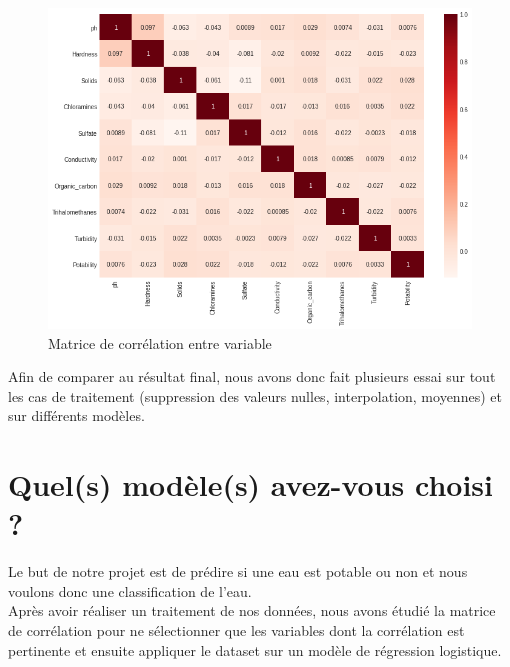 \documentclass[12pt, a4paper]{article}
\begin{document}
    \begin{figure}[H]
           \centering
           \includegraphics[width=\textwidth]{images/output_64_0.png}
           \caption{Matrice de corrélation entre variable}
            \label{fig:mat_corr}
    \end{figure}
    
    Afin de comparer au résultat final, nous avons donc fait plusieurs essai sur tout les cas de traitement (suppression des valeurs nulles, interpolation, moyennes) et sur différents modèles.
    \section{Quel(s) modèle(s) avez-vous choisi ?}
    Le but de notre projet est de prédire si une eau est potable ou non et nous voulons donc une classification de l'eau.\\
    Après avoir réaliser un traitement de nos données, nous avons étudié la matrice de corrélation pour ne sélectionner que les variables dont la corrélation est pertinente et ensuite appliquer le dataset sur un modèle de régression logistique.
    \newpage
\end{document}
